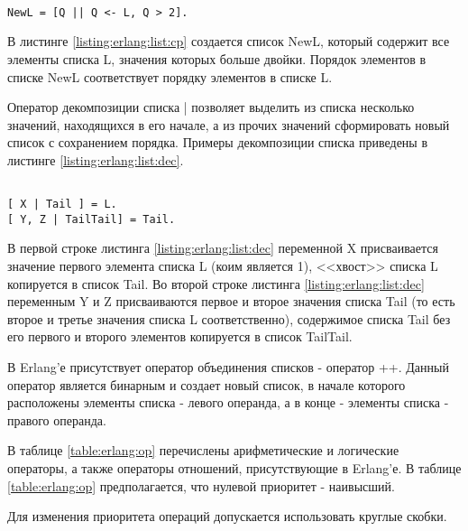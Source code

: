 \begin{itemize}
\begin{lstlisting}

NewL = [Q || Q <- L, Q > 2].

\end{lstlisting}
\mylistingend

		В листинге \ref{listing:erlang:list:cp} создается список NewL, который содержит все элементы списка L, значения которых больше двойки. Порядок элементов в списке NewL соответствует порядку элементов в списке L.

		Оператор декомпозиции списка | позволяет выделить из списка несколько значений, находящихся в его начале, а из прочих значений сформировать новый список с сохранением порядка. Примеры декомпозиции списка приведены в листинге \ref{listing:erlang:list:dec}.

\begin{lstlisting}

[ X | Tail ] = L.
[ Y, Z | TailTail] = Tail.

\end{lstlisting}
\mylistingend

\end{itemize}

		В первой строке листинга \ref{listing:erlang:list:dec} переменной X присваивается значение первого элемента списка L (коим является 1), <<хвост>> списка L копируется в список Tail. Во второй строке листинга \ref{listing:erlang:list:dec} переменным Y и Z присваиваются первое и второе значения списка Tail (то есть второе и третье значения списка L соответственно), содержимое списка Tail без его первого и второго элементов копируется в список TailTail.

		В Erlang'е присутствует оператор объединения списков - оператор ++. Данный оператор является бинарным и создает новый список, в начале которого расположены элементы списка - левого операнда, а в конце - элементы списка - правого операнда.



В таблице \ref{table:erlang:op} перечислены арифметические и логические операторы, а также операторы отношений, присутствующие в Erlang'е. В таблице \ref{table:erlang:op} предполагается, что нулевой приоритет - наивысший.

Для изменения приоритета операций допускается использовать круглые скобки.

